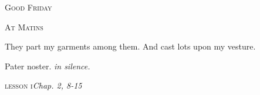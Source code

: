 ﻿%
\vspace*{-50pt plus 20pt}
\begin{center}{%
\huge \textsc{Good Friday}

\bigskip
\normalsize\textsc{At Matins}
}\end{center}


\def\officehour{Matins}
\def\matinsnocturn{1st Nocturn}
%
\large
\def\preant{\setgrefactor{17}\large}
\def\anttranslation{The kings of the earth stood up, and the princes met together, against the Lord, and against His Anointed.}
\def\psalmtranslationsmall{T}
%
\def\preant{\setgrefactor{17}\large}
\def\prepsalm{\normalsize}
\def\psalmtranslationsmall{T}
\def\anttranslation{They parted my garments amongst them, and upon my vesture they cast lots.}
\let\prepsalm=\undefined
\bigskip
%
\def\preant{\setgrefactor{17}\large}
\def\psalmtranslationsmall{T}
\def\anttranslation{False witnesses are risen up against me, and iniquity hath belied itself.}
\def\prepsalm{\setgrefactor{16}\normalsize\greblockcustos}
\let\prepsalm=\undefined

\bigskip
{}
{They part my garments among them.}
{And cast lots upon my vesture.}

\bigskip
Pater noster. \emph{in silence.}

\medskip
\hspace{10ex}\textsc{lesson i}\hfill\emph{Chap. 2, 8-15}\hspace{10ex}

